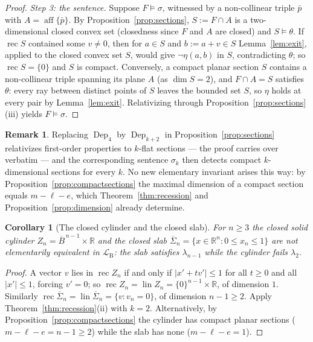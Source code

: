 \documentclass[11pt]{amsart}
\newtheorem{corollary}[theorem]{Corollary}
\theoremstyle{definition}
\newtheorem{remark}[theorem]{Remark}
\newcommand{\R}{\mathbb{R}}
\newcommand{\LB}{\mathcal{L}_{\mathrm{B}}}
\newcommand{\Dep}{\operatorname{Dep}}
\newcommand{\aff}{\operatorname{aff}}
\newcommand{\rec}{\operatorname{rec}}
\newcommand{\lin}{\operatorname{lin}}
\begin{document}
\begin{proof}
\emph{Step 3: the sentence.} Suppose $F\models\sigma$, witnessed by a
non-collinear triple $\bar p$ with $A=\aff\{\bar p\}$. By
Proposition~\ref{prop:sections}, $S:=F\cap A$ is a two-dimensional closed
convex set (closedness since $F$ and $A$ are closed) and
$S\models\theta$. If $\rec S$ contained some $v\ne0$, then for $a\in S$ and
$b:=a+v\in S$ Lemma~\ref{lem:exit}, applied to the closed convex set $S$,
would give $\neg\eta(a,b)$ in $S$, contradicting $\theta$; so
$\rec S=\{0\}$ and $S$ is compact. Conversely, a compact planar section $S$
contains a non-collinear triple spanning its plane $A$ (as $\dim S=2$), and
$F\cap A=S$ satisfies $\theta$: every ray between distinct points of $S$
leaves the bounded set $S$, so $\eta$ holds at every pair by
Lemma~\ref{lem:exit}. Relativizing through
Proposition~\ref{prop:sections}(iii) yields $F\models\sigma$.
\end{proof}

\begin{remark}
Replacing $\Dep_4$ by $\Dep_{k+2}$ in Proposition~\ref{prop:sections}
relativizes first-order properties to $k$-flat sections --- the proof
carries over verbatim --- and the corresponding sentence $\sigma_k$ then
detects compact $k$-dimensional sections for every $k$. No new elementary
invariant arises this way: by Proposition~\ref{prop:compactsections} the
maximal dimension of a compact section equals $m-\ell-e$, which
Theorem~\ref{thm:recession} and Proposition~\ref{prop:dimension} already
determine.
\end{remark}

\begin{corollary}[The closed cylinder and the closed slab]\label{cor:cyl-slab}
For $n\ge3$ the closed solid cylinder $Z_n=\overline B^{\,n-1}\times\R$ and
the closed slab $\overline\Sigma_n=\{x\in\R^n:0\le x_n\le1\}$ are not
elementarily equivalent in $\LB$: the slab satisfies $\lambda_{n-1}$ while
the cylinder fails $\lambda_2$.
\end{corollary}

\begin{proof}
A vector $v$ lies in $\rec Z_n$ if and only if $|x'+tv'|\le1$ for all
$t\ge0$ and all $|x'|\le1$, forcing $v'=0$; so
$\rec Z_n=\lin Z_n=\{0\}^{n-1}\times\R$, of dimension $1$. Similarly
$\rec\overline\Sigma_n=\lin\overline\Sigma_n=\{v:v_n=0\}$, of dimension
$n-1\ge2$. Apply Theorem~\ref{thm:recession}(ii) with $k=2$. Alternatively,
by Proposition~\ref{prop:compactsections} the cylinder has compact planar
sections ($m-\ell-e=n-1\ge2$) while the slab has none ($m-\ell-e=1$).
\end{proof}
\end{document}
